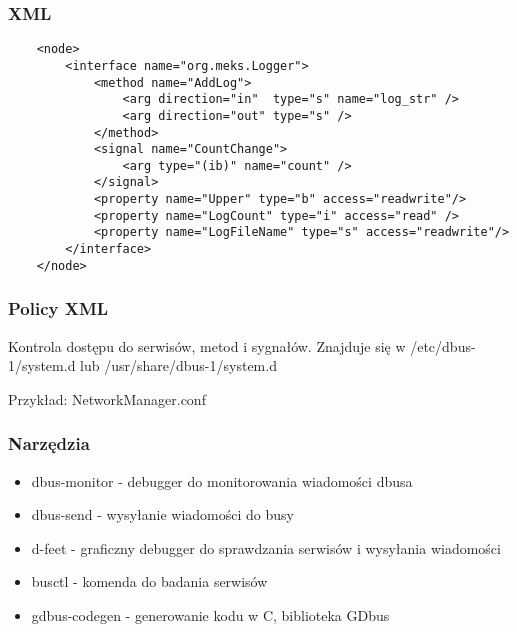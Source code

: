 




\begin{frame}[fragile]
    \frametitle{XML}
    \lstset{
    basicstyle=\tiny\ttfamily, 
    breaklines=true,           
    breakatwhitespace=true,    
    stepnumber=1               
}
    \begin{lstlisting}
    <node>
        <interface name="org.meks.Logger">
            <method name="AddLog">
                <arg direction="in"  type="s" name="log_str" />
                <arg direction="out" type="s" />
            </method>
            <signal name="CountChange">
                <arg type="(ib)" name="count" />
            </signal>
            <property name="Upper" type="b" access="readwrite"/>
            <property name="LogCount" type="i" access="read" />
            <property name="LogFileName" type="s" access="readwrite"/>
        </interface>
    </node>

    \end{lstlisting}
\end{frame}


\begin{frame}
    \frametitle{Policy XML}
    Kontrola dostępu do serwisów, metod i sygnałów.
    Znajduje się w /etc/dbus-1/system.d lub /usr/share/dbus-1/system.d

    Przykład: NetworkManager.conf
\end{frame}



\begin{frame}
    \frametitle{Narzędzia}
    \begin{itemize}
        \item dbus-monitor - debugger do monitorowania wiadomości dbusa
        \item dbus-send - wysyłanie wiadomości do busy
        \item d-feet - graficzny debugger do sprawdzania
        serwisów i wysyłania wiadomości
        \item busctl - komenda do badania serwisów
        \item gdbus-codegen - generowanie kodu w C, biblioteka GDbus
    \end{itemize}
\end{frame}

